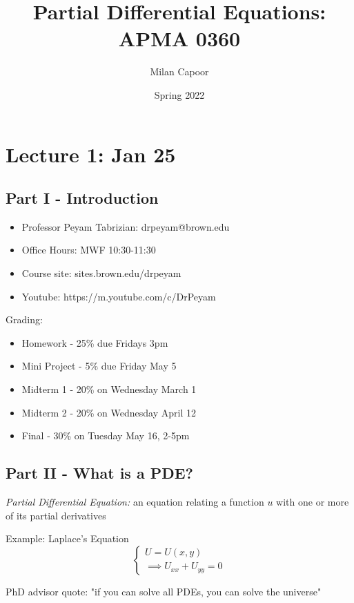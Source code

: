 \documentclass[12pt]{article}
\title{Partial Differential Equations: APMA 0360}
\author{Milan Capoor}
\date{Spring 2022}
\begin{document}
\maketitle
\section{Lecture 1: Jan 25}
\subsection*{Part I - Introduction}

\begin{itemize}
    \item Professor Peyam Tabrizian: drpeyam@brown.edu
    \item Office Hours: MWF 10:30-11:30
    \item Course site: sites.brown.edu/drpeyam
    \item Youtube: https://m.youtube.com/c/DrPeyam
\end{itemize}

Grading:
\begin{itemize}
    \item Homework - 25\% due Fridays 3pm
    \item Mini Project - 5\% due Friday May 5
    \item Midterm 1 - 20\% on Wednesday March 1
    \item Midterm 2 - 20\% on Wednesday April 12
    \item Final - 30\% on Tuesday May 16, 2-5pm 
\end{itemize}

\subsection*{Part II - What is a PDE?}
\emph{Partial Differential Equation:} an equation relating a function $u$ with one or more of its partial derivatives

Example: Laplace's Equation
\[\begin{cases}
    U = U(x, y)\\
    \implies U_{xx} + U_{yy} = 0
\end{cases}\]

PhD advisor quote: "if you can solve all PDEs, you can solve the universe"
\end{document}
